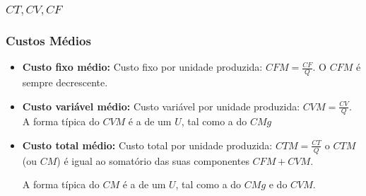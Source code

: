 \begin{frame}
	\frametitle{$CT,CV,CF$}
	\begin{center}
	\end{center}
\end{frame}

\begin{frame}
	\frametitle{Custos M\'edios}
	\pause
	\begin{itemize}
		\item \textbf{Custo fixo m\'edio:} Custo fixo por unidade produzida: $CFM=\frac{CF}{Q}$. O $CFM$ \'e sempre decrescente. \pause
		\item \textbf{Custo vari\'avel m\'edio:} Custo vari\'avel por unidade produzida: $CVM=\frac{CV}{Q}$. A forma t\'ipica do $CVM$ \'e a de um $U$, tal como a do $CMg$ \pause
		\item \textbf{Custo total m\'edio:} Custo total por unidade produzida: $CTM=\frac{CT}{Q}$ o $CTM$ (ou $CM$) \'e igual ao somat\'orio das suas componentes $CFM+CVM$. 

		A forma t\'ipica do $CM$ \'e a de um $U$, tal como a do $CMg$ e do $CVM$.
	\end{itemize}
\end{frame}

